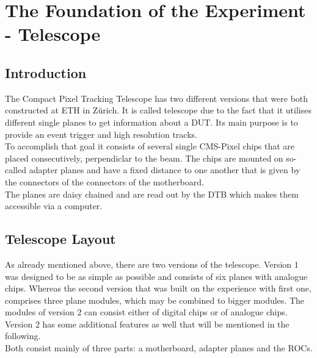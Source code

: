 \documentclass[british,11pt,a4paper]{memoir}
\begin{document}
\chapter{The Foundation of the Experiment - Telescope}
\section{Introduction}\label{s20}
The Compact Pixel Tracking Telescope has two different versions that were both constructed at \ac{ETH} in Z{\"u}rich. It is called telescope due to the fact that it utilises different single planes to get information about a \ac{DUT}. Its main purpose is to provide an event trigger and high resolution tracks.\\ 
To accomplish that goal it consists of several single \ac{CMS}-Pixel chips that are placed consecutively, perpendiclar to the beam. The chips are mounted on so-called adapter planes and have a fixed distance to one another that is given by the connectors of the connectors of the motherboard.\\
The planes are daisy chained and are read out by the \ac{DTB} which makes them accessible via a computer.
\section{Telescope Layout}\label{s21}
As already mentioned above, there are two versions of the telescope. Version 1 was designed to be as simple as possible and consists of six planes with analogue chips. Whereas the second version that was built on the experience with first one, comprises three plane modules, which may be combined to bigger modules. The modules of version 2 can consist either of digital chips or of analogue chips. Version 2 has some additional features as well that will be mentioned in the following.\\
Both consist mainly of three parts: a motherboard, adapter planes and the \ac{ROC}s.
\end{document}
